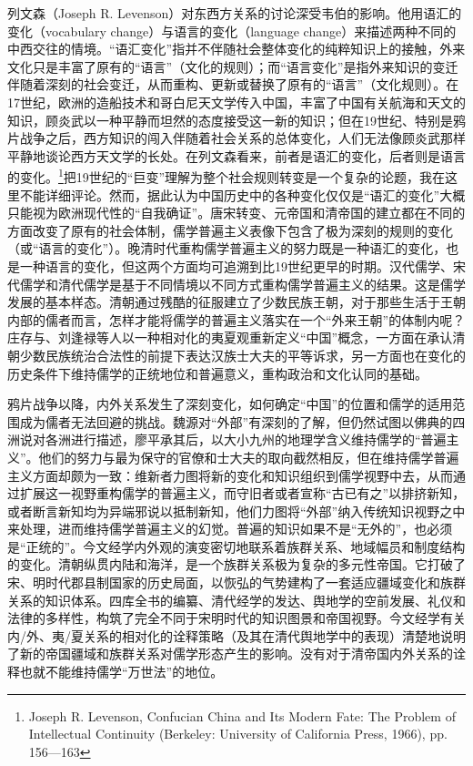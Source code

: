 \documentclass[a4paper, 12pt, openright]{ctexbook}
\begin{document}
列文森（Joseph R. Levenson）对东西方关系的讨论深受韦伯的影响。他用语汇的变化（vocabulary change）与语言的变化（language change）来描述两种不同的中西交往的情境。“语汇变化”指并不伴随社会整体变化的纯粹知识上的接触，外来文化只是丰富了原有的“语言”（文化的规则）；而“语言变化”是指外来知识的变迁伴随着深刻的社会变迁，从而重构、更新或替换了原有的“语言”（文化规则）。在17世纪，欧洲的造船技术和哥白尼天文学传入中国，丰富了中国有关航海和天文的知识，顾炎武以一种平静而坦然的态度接受这一新的知识；但在19世纪、特别是鸦片战争之后，西方知识的闯入伴随着社会关系的总体变化，人们无法像顾炎武那样平静地谈论西方天文学的长处。在列文森看来，前者是语汇的变化，后者则是语言的变化。\footnote{Joseph R. Levenson, Confucian China and Its Modern Fate: The Problem of Intellectual Continuity (Berkeley: University of California Press, 1966), pp. 156—163}把19世纪的“巨变”理解为整个社会规则转变是一个复杂的论题，我在这里不能详细评论。然而，据此认为中国历史中的各种变化仅仅是“语汇的变化”大概只能视为欧洲现代性的“自我确证”。唐宋转变、元帝国和清帝国的建立都在不同的方面改变了原有的社会体制，儒学普遍主义表像下包含了极为深刻的规则的变化（或“语言的变化”）。晚清时代重构儒学普遍主义的努力既是一种语汇的变化，也是一种语言的变化，但这两个方面均可追溯到比19世纪更早的时期。汉代儒学、宋代儒学和清代儒学是基于不同情境以不同方式重构儒学普遍主义的结果。这是儒学发展的基本样态。清朝通过残酷的征服建立了少数民族王朝，对于那些生活于王朝内部的儒者而言，怎样才能将儒学的普遍主义落实在一个“外来王朝”的体制内呢？庄存与、刘逢禄等人以一种相对化的夷夏观重新定义“中国”概念，一方面在承认清朝少数民族统治合法性的前提下表达汉族士大夫的平等诉求，另一方面也在变化的历史条件下维持儒学的正统地位和普遍意义，重构政治和文化认同的基础。

鸦片战争以降，内外关系发生了深刻变化，如何确定“中国”的位置和儒学的适用范围成为儒者无法回避的挑战。魏源对“外部”有深刻的了解，但仍然试图以佛典的四洲说对各洲进行描述，廖平承其后，以大小九州的地理学含义维持儒学的“普遍主义”。他们的努力与最为保守的官僚和士大夫的取向截然相反，但在维持儒学普遍主义方面却颇为一致：维新者力图将新的变化和知识组织到儒学视野中去，从而通过扩展这一视野重构儒学的普遍主义，而守旧者或者宣称“古已有之”以排挤新知，或者断言新知均为异端邪说以抵制新知，他们力图将“外部”纳入传统知识视野之中来处理，进而维持儒学普遍主义的幻觉。普遍的知识如果不是“无外的”，也必须是“正统的”。今文经学内外观的演变密切地联系着族群关系、地域幅员和制度结构的变化。清朝纵贯内陆和海洋，是一个族群关系极为复杂的多元性帝国。它打破了宋、明时代郡县制国家的历史局面，以恢弘的气势建构了一套适应疆域变化和族群关系的知识体系。四库全书的编纂、清代经学的发达、舆地学的空前发展、礼仪和法律的多样性，构筑了完全不同于宋明时代的知识图景和帝国视野。今文经学有关内/外、夷/夏关系的相对化的诠释策略（及其在清代舆地学中的表现）清楚地说明了新的帝国疆域和族群关系对儒学形态产生的影响。没有对于清帝国内外关系的诠释也就不能维持儒学“万世法”的地位。
\end{document}
